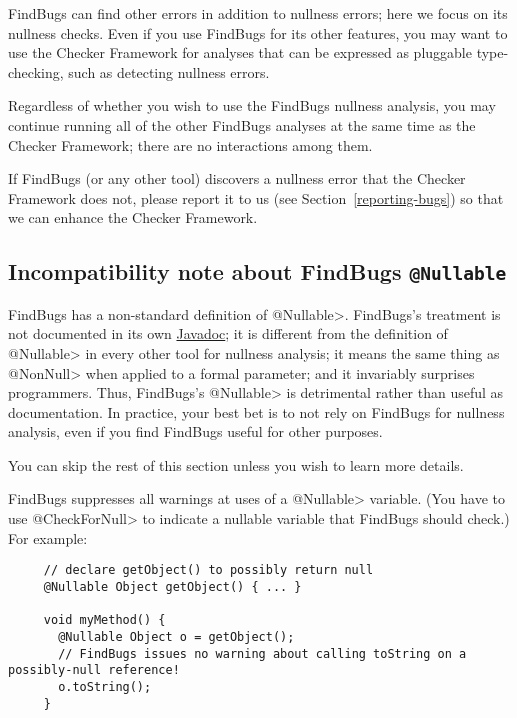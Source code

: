 FindBugs can find other errors in addition to nullness errors; here
we focus on its nullness checks.  Even if you use FindBugs for its other
features, you may want to use the Checker Framework for analyses that can
be expressed as pluggable type-checking, such as detecting nullness errors.

Regardless of whether you wish to use the FindBugs nullness analysis, you
may continue running all of the other FindBugs analyses at the same time as
the Checker Framework; there are no interactions among them.

If FindBugs (or any other tool) discovers a nullness error that the Checker
Framework does not, please report it to us (see
Section~\ref{reporting-bugs}) so that we can enhance the Checker Framework.



\subsection{Incompatibility note about FindBugs \tt{@Nullable}\label{findbugs-nullable}}

FindBugs has a non-standard definition of \<@Nullable>.  FindBugs's treatment is not
documented in its own
\href{http://findbugs.sourceforge.net/api/edu/umd/cs/findbugs/annotations/Nullable.html}{Javadoc};
it is different from the definition of \<@Nullable> in every other tool for
nullness analysis; it means the same thing as \<@NonNull> when applied to a
formal parameter; and it invariably surprises programmers.  Thus, FindBugs's
\<@Nullable> is detrimental rather than useful as documentation.
In practice, your best bet is to not rely on FindBugs for nullness analysis,
even if you find FindBugs useful for other purposes.

You can skip the rest of this section unless you wish to learn more details.

FindBugs suppresses all warnings at uses of a \<@Nullable> variable.
(You have to use \<@CheckForNull> to
indicate a nullable variable that FindBugs should check.)  For example:

\begin{Verbatim}
     // declare getObject() to possibly return null
     @Nullable Object getObject() { ... }

     void myMethod() {
       @Nullable Object o = getObject();
       // FindBugs issues no warning about calling toString on a possibly-null reference!
       o.toString();
     }
\end{Verbatim}

